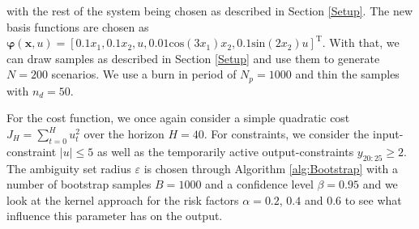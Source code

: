 with the rest of the system being chosen as described in Section \ref{Setup}. The new basis functions are chosen as $\boldsymbol{\varphi} (\boldsymbol{x}, u) = \left[0.1 x_1,  0.1 x_2,  u, 0.01 \text{cos} ( 3 x_1) x_2, 0.1 \text{sin} (2 x_2) u \right]^\text{T}$. With that, we can draw samples as described in Section \ref{Setup} and use them to generate $N = 200$ scenarios. We use a burn in period of $N_p = 1000$ and thin the samples with $n_d = 50$.

For the cost function, we once again consider a simple quadratic cost $J_H = \sum_{t = 0}^H u_t^2$ over the horizon $H = 40$. For constraints, we consider the input-constraint $\left| u \right| \leq 5$ as well as the temporarily active output-constraints $y_{20:25} \geq 2$. The ambiguity set radius $\varepsilon$ is chosen through Algorithm \ref{alg:Bootstrap} with a number of bootstrap samples $B = 1000$ and a confidence level $\beta = 0.95$ and we look at the kernel approach for the risk factors $\alpha = 0.2$, $0.4$ and $0.6$ to see what influence this parameter has on the output.

